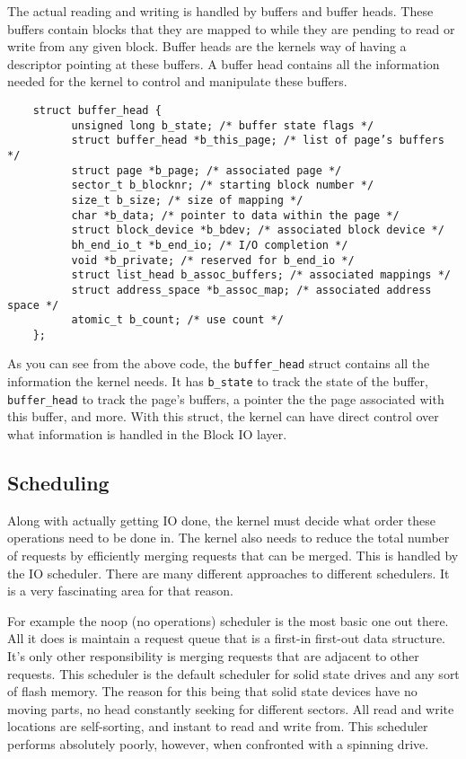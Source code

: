\documentclass[10pt,letterpaper,onecolumn,draftclsnofoot]{IEEEtran}
\begin{document}
  The actual reading and writing is handled by buffers and buffer heads. These
  buffers contain blocks that they are mapped to while they are pending to read
  or write from any given block. Buffer heads are the kernels way of having a
  descriptor pointing at these buffers. A buffer head contains all the information
  needed for the kernel to control and manipulate these buffers. \cite{robertlove2010}

  \begin{lstlisting}
    struct buffer_head {
          unsigned long b_state; /* buffer state flags */
          struct buffer_head *b_this_page; /* list of page’s buffers */
          struct page *b_page; /* associated page */
          sector_t b_blocknr; /* starting block number */
          size_t b_size; /* size of mapping */
          char *b_data; /* pointer to data within the page */
          struct block_device *b_bdev; /* associated block device */
          bh_end_io_t *b_end_io; /* I/O completion */
          void *b_private; /* reserved for b_end_io */
          struct list_head b_assoc_buffers; /* associated mappings */
          struct address_space *b_assoc_map; /* associated address space */
          atomic_t b_count; /* use count */
    };
\end{lstlisting}
  As you can see from the above code, the \texttt{buffer\_head} struct contains
  all the information the kernel needs. It has \texttt{b\_state} to track the
  state of the buffer, \texttt{buffer\_head} to track the page's buffers,  a pointer
  the the page associated with this buffer, and more. With this struct, the kernel
  can have direct control over what information is handled in the Block IO layer.

  \subsection{Scheduling}
  Along with actually getting IO done, the kernel must decide what order these
  operations need to be done in. The kernel also needs to reduce the total
  number of requests by efficiently merging requests that can be merged. This is
  handled by the IO scheduler. There are many different approaches to different
  schedulers. It is a very fascinating area for that reason.

  For example the noop (no operations) scheduler is the most basic one out there.
  All it does is maintain a request queue that is a first-in first-out data structure. It's
  only other responsibility is merging requests that are adjacent to other requests.
  This scheduler is the default scheduler for solid state drives and any sort of
  flash memory. The reason for this being that solid state devices have no moving
  parts, no head constantly seeking for different sectors. All read and write locations
  are self-sorting, and instant to read and write from. This scheduler performs
  absolutely poorly, however, when confronted with a spinning drive.
\end{document}
